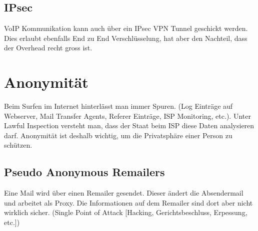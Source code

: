 \subsection{IPsec}
VoIP Kommunikation kann auch über ein IPsec VPN Tunnel geschickt werden. Dies erlaubt ebenfalls End zu End Verschlüsselung, hat aber den Nachteil, dass der Overhead recht gross ist.

\section{Anonymität}
Beim Surfen im Internet hinterlässt man immer Spuren. (Log Einträge auf Webserver, Mail Transfer Agents, Referer Einträge, ISP Monitoring, etc.). Unter Lawful Inspection versteht man, dass der Staat beim ISP diese Daten analysieren darf. Anonymität ist deshalb wichtig, um die Privatsphäre einer Person zu schützen.


\subsection{Pseudo Anonymous Remailers}
Eine Mail wird über einen Remailer gesendet. Dieser ändert die Absendermail und arbeitet als Proxy. Die Informationen auf dem Remailer sind dort aber nicht wirklich sicher. (Single Point of Attack [Hacking, Gerichtsbeschluss, Erpessung, etc.])
